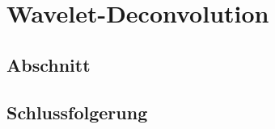 %
%
%
\chapter{Wavelet-Deconvolution\label{chapter:deconvolve}}
\begin{refsection}

\section{Abschnitt}

\section{Schlussfolgerung}

\printbibliography[heading=subbibliography]
\end{refsection}
